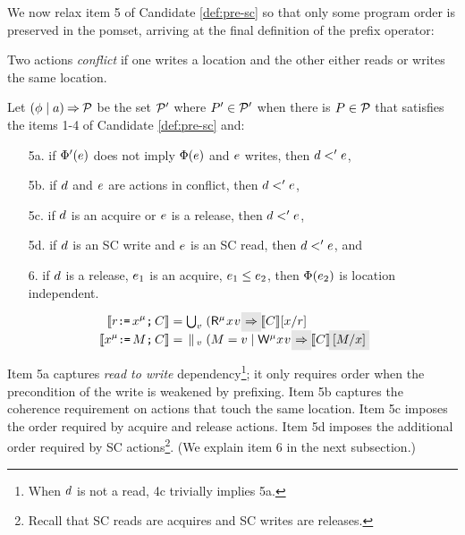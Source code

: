 We now relax item 5 of Candidate \ref{def:pre-sc} so that only some program
order is {preserved} in the pomset, arriving at the final definition of
the prefix operator: %
\begin{definition}
  \label{def:prefix}
Two actions \emph{conflict} if one writes a location and the other
either reads or writes the same location.

Let $(\phi \mid a) \mathbin\Rightarrow \mathcal{P}$ be the set $\mathcal{P}'$ where $P'\in\mathcal{P}'$ when
there is $P\in\mathcal{P}$ that satisfies the items 1-4 of
Candidate \ref{def:pre-sc} and:
\begin{enumerate}
\item[5a.] if %
  $\Phi'(e)$ does not imply $\Phi(e)$ and $e$ writes, then
  $d<'e$,
\item[5b.] if $d$ and $e$ are \external actions in conflict,
    then $d<'e$, %
\item[5c.] if $d$ is an acquire or $e$ is a release, then $d <' e$, 
\item[5d.] if $d$ is an SC write and $e$ is an SC read, then $d <' e$, and
\item[6.] if $d$ is a release, $e_1$ is an acquire, $e_1\le e_2$, then $\Phi(e_2)$
  is location independent.
\end{enumerate}
\end{definition}
\begin{candidate}
    \begin{align*}
    \sem{\aReg\GETS\aLoc^\amode\SEMI \aCmd} & =
    \textstyle\bigcup_\aVal\; (\DRmode\aLoc\aVal) \mathhl{\prefix}\; \sem{\aCmd} [\aLoc/\aReg] 
    \\
    \sem{\aLoc^\amode\GETS\aExp\SEMI \aCmd} & =
    \textstyle\PAR_\aVal\; (\aExp=\aVal \mid \DWmode\aLoc\aVal) \mathhl{\prefix}\; \sem{\aCmd}\mkern3.5mu\mathhl{[\aExp/\aLoc]}
  \end{align*}
\end{candidate}
Item 5a captures \emph{read to write} dependency\footnote{When $d$ is not a read,
  4c trivially implies 5a.}; it only requires order when the precondition of
the write is weakened by prefixing.  Item 5b captures the coherence
requirement on actions that touch the same location.  Item 5c imposes the
order required by acquire and release actions.  Item 5d imposes the
additional order required by SC actions\footnote{Recall that SC reads are
  acquires and SC writes are releases.}.  (We explain item 6 in the next subsection.)

